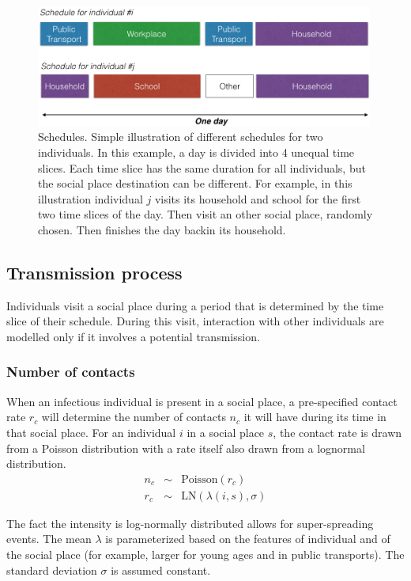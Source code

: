 \documentclass[11pt, onecolumn]{article}
\begin{document}
\begin{figure}[!ht]
\centering
    \includegraphics[angle=0,width=0.99\textwidth]{figures/schedule.png}
\caption{Schedules. Simple illustration of different schedules for two individuals. In this example, a day is divided into 4 unequal time slices. Each time slice has the same duration for all individuals, but the social place destination can be different. For example, in this illustration individual $j$ visits its household and school for the first two time slices of the day. Then visit an other social place, randomly chosen. Then finishes the day backin its household.}
\label{fig:SP_indiv}
\end{figure}


\subsection{Transmission process}

Individuals visit a social place during a period that is determined by the time slice of their schedule. During this visit, interaction with other individuals are modelled only if it involves a potential transmission. 

\subsubsection*{Number of contacts}

When an infectious individual is present in a social place, a pre-specified contact rate $r_c$ will determine the number of contacts $n_c$ it will have during its time in that social place. For an individual $i$ in a social place $s$, the contact rate is drawn from a Poisson distribution with a rate itself also drawn from a lognormal distribution. 
\begin{eqnarray}
n_c & \sim & \text{Poisson}(r_c)\\
r_c & \sim & \text{LN}(\lambda(i,s), \sigma)
\end{eqnarray}

The fact the intensity is log-normally distributed allows for super-spreading events. The mean $\lambda$ is parameterized based on the features of individual and of the social place (for example, larger for young ages and in public transports). The standard deviation $\sigma$ is assumed constant.
\end{document}

